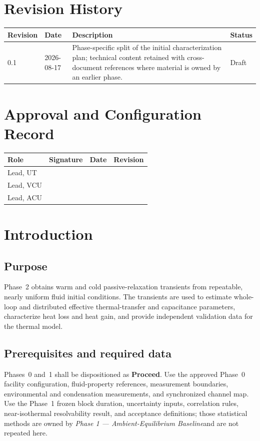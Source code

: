 \documentclass[11pt]{article}
\newcommand{\PhaseOneDoc}{\textit{Phase 1 --- Ambient-Equilibrium Baseline}}
\begin{document}
\clearpage
{}
\section*{Revision History}
\begin{tabularx}{\textwidth}{@{}p{0.75in}p{1.2in}>{\raggedright\arraybackslash}X>{\raggedright\arraybackslash}p{1.15in}@{}}
\toprule
\textbf{Revision} & \textbf{Date} & \textbf{Description} & \textbf{Status} \\
\midrule
0.1 & 2026-08-17 & Phase-specific split of the initial characterization plan; technical content retained with cross-document references where material is owned by an earlier phase. & Draft \\
\bottomrule
\end{tabularx}

\vspace{0.25in}
\section*{Approval and Configuration Record}
\begin{tabularx}{\textwidth}{@{}p{1.55in}X p{1.25in}p{1.05in}@{}}
\toprule
\textbf{Role} & \textbf{Signature} & \textbf{Date} & \textbf{Revision} \\
\midrule
Lead, UT & & & \\
Lead, VCU & & & \\
Lead, ACU & & & \\
\bottomrule
\end{tabularx}
\clearpage
\tableofcontents
\clearpage
{}

\section{Introduction}
\label{sec:introduction}
\subsection{Purpose}
Phase~2 obtains warm and cold passive-relaxation transients from repeatable, nearly uniform fluid initial conditions. The transients are used to estimate whole-loop and distributed effective thermal-transfer and capacitance parameters, characterize heat loss and heat gain, and provide independent validation data for the thermal model.

\subsection{Prerequisites and required data}
Phases~0 and~1 shall be dispositioned as \textbf{Proceed}. Use the approved Phase~0 facility configuration, fluid-property references, measurement boundaries, environmental and condensation measurements, and synchronized channel map. Use the Phase~1 frozen block duration, uncertainty inputs, correlation rules, near-isothermal resolvability result, and acceptance definitions; those statistical methods are owned by \PhaseOneDoc and are not repeated here.
\end{document}
